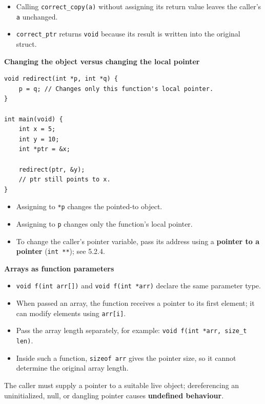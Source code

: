 \documentclass[11pt,a4paper]{article}
\begin{document}
\begin{itemize}
    \item Calling \texttt{correct\_copy(a)} without assigning its
          return value leaves the caller's \texttt{a} unchanged.
    \item \texttt{correct\_ptr} returns \texttt{void} because its
          result is written into the original struct.
\end{itemize}

\textbf{Changing the object versus changing the local pointer}

\begin{lstlisting}[style=cscode]
void redirect(int *p, int *q) {
    p = q; // Changes only this function's local pointer.
}

int main(void) {
    int x = 5;
    int y = 10;
    int *ptr = &x;

    redirect(ptr, &y);
    // ptr still points to x.
}
\end{lstlisting}

\begin{itemize}
    \item Assigning to \texttt{*p} changes the pointed-to object.
    \item Assigning to \texttt{p} changes only the function's
          local pointer.
    \item To change the caller's pointer variable, pass its
          address using a \textbf{pointer to a pointer}
          (\texttt{int **}); see 5.2.4.
\end{itemize}

\textbf{Arrays as function parameters}

\begin{itemize}
    \item \texttt{void f(int arr[])} and
          \texttt{void f(int *arr)} declare the same parameter type.
    \item When passed an array, the function receives a pointer
          to its first element; it can modify elements using
          \texttt{arr[i]}.
    \item Pass the array length separately, for example:
          \texttt{void f(int *arr, size\_t len)}.
    \item Inside such a function, \texttt{sizeof arr} gives the
          pointer size, so it cannot determine the original
          array length.
\end{itemize}

The caller must supply a pointer to a suitable live object;
dereferencing an uninitialized, null, or dangling pointer
causes \textbf{undefined behaviour}.
\end{document}
